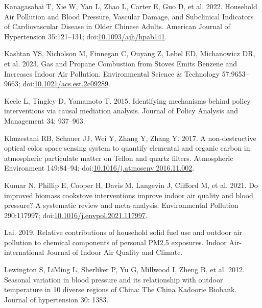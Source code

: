 \documentclass[
  letterpaper,
  DIV=11,
  numbers=noendperiod]{scrartcl}
\newlength{\cslhangindent}
\newlength{\cslentryspacingunit} %
\newenvironment{CSLReferences}[2] %
 {%
  \setlength{\parindent}{0pt}
  \ifodd #1
  \let\oldpar\par
  \def\par{\hangindent=\cslhangindent\oldpar}
  \fi
  \setlength{\parskip}{#2\cslentryspacingunit}
 }%
 {}
\begin{document}
\begin{CSLReferences}{1}{0}
\leavevmode{}%
Kanagasabai T, Xie W, Yan L, Zhao L, Carter E, Guo D, et al. 2022.
Household {Air Pollution} and {Blood Pressure}, {Vascular Damage}, and
{Subclinical Indicators} of {Cardiovascular Disease} in {Older Chinese
Adults}. American Journal of Hypertension 35:121--131;
doi:\href{https://doi.org/10.1093/ajh/hpab141}{10.1093/ajh/hpab141}.

\leavevmode{}%
Kashtan YS, Nicholson M, Finnegan C, Ouyang Z, Lebel ED, Michanowicz DR,
et al. 2023. Gas and {Propane Combustion} from {Stoves Emits Benzene}
and {Increases Indoor Air Pollution}. Environmental Science \&
Technology 57:9653--9663;
doi:\href{https://doi.org/10.1021/acs.est.2c09289}{10.1021/acs.est.2c09289}.

\leavevmode{}%
Keele L, Tingley D, Yamamoto T. 2015. Identifying mechanisms behind
policy interventions via causal mediation analysis. Journal of Policy
Analysis and Management 34: 937--963.

\leavevmode{}%
Khuzestani RB, Schauer JJ, Wei Y, Zhang Y, Zhang Y. 2017. A
non-destructive optical color space sensing system to quantify elemental
and organic carbon in atmospheric particulate matter on {Teflon} and
quartz filters. Atmospheric Environment 149:84--94;
doi:\href{https://doi.org/10.1016/j.atmosenv.2016.11.002}{10.1016/j.atmosenv.2016.11.002}.

\leavevmode{}%
Kumar N, Phillip E, Cooper H, Davis M, Langevin J, Clifford M, et al.
2021. Do improved biomass cookstove interventions improve indoor air
quality and blood pressure? {A} systematic review and meta-analysis.
Environmental Pollution 290:117997;
doi:\href{https://doi.org/10.1016/j.envpol.2021.117997}{10.1016/j.envpol.2021.117997}.

\leavevmode{}%
Lai. 2019. Relative contributions of household solid fuel use and
outdoor air pollution to chemical components of personal {PM2}.5
exposures. Indoor Air-international Journal of Indoor Air Quality and
Climate.

\leavevmode{}%
Lewington S, LiMing L, Sherliker P, Yu G, Millwood I, Zheng B, et al.
2012. Seasonal variation in blood pressure and its relationship with
outdoor temperature in 10 diverse regions of {China}: The {China
Kadoorie Biobank}. Journal of hypertension 30: 1383.


\end{CSLReferences}
\end{document}
